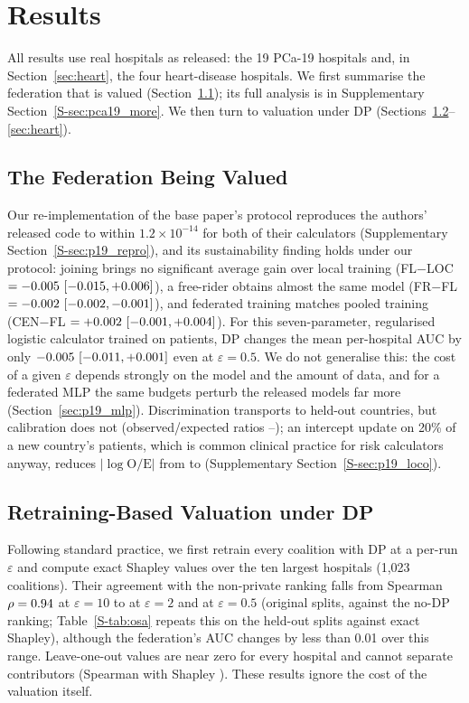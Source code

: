\section{Results}
\label{sec:results}
All results use real hospitals as released: the 19 PCa-19 hospitals and, in Section~\ref{sec:heart}, the four heart-disease hospitals. We first summarise the federation that is valued (Section~\ref{sec:federation}); its full analysis is in Supplementary Section~\ref{S-sec:pca19_more}. We then turn to valuation under DP (Sections~\ref{sec:p19_retrain}--\ref{sec:heart}).

\subsection{The Federation Being Valued}
\label{sec:federation}
Our re-implementation of the base paper's protocol reproduces the authors' released code to within $1.2\times10^{-14}$ for both of their calculators (Supplementary Section~\ref{S-sec:p19_repro}), and its sustainability finding holds under our protocol: joining brings no significant average gain over local training (FL$-$LOC $=-0.005\ [-0.015, +0.006]$), a free-rider obtains almost the same model (FR$-$FL $=-0.002\ [-0.002, -0.001]$), and federated training matches pooled training (CEN$-$FL $=+0.002\ [-0.001, +0.004]$). For this seven-parameter, regularised logistic calculator trained on \pNineN{} patients, DP changes the mean per-hospital AUC by only $-0.005\ [-0.011, +0.001]$ even at $\varepsilon=0.5$. We do not generalise this: the cost of a given $\varepsilon$ depends strongly on the model and the amount of data, and for a federated MLP the same budgets perturb the released models far more (Section~\ref{sec:p19_mlp}). Discrimination transports to held-out countries, but calibration does not (observed/expected ratios \pOeMin--\pOeMax); an intercept update on 20\% of a new country's patients, which is common clinical practice for risk calculators anyway, reduces $|\log\mathrm{O/E}|$ from \pRecalOeRaw{} to \pRecalOeInt{} (Supplementary Section~\ref{S-sec:p19_loco}).

\subsection{Retraining-Based Valuation under DP}
\label{sec:p19_retrain}
Following standard practice, we first retrain every coalition with DP at a per-run $\varepsilon$ and compute exact Shapley values over the ten largest hospitals (1{,}023 coalitions). Their agreement with the non-private ranking falls from Spearman $\rho=0.94$ at $\varepsilon=10$ to \pShRhoTwo{} at $\varepsilon=2$ and \pShRhoHalf{} at $\varepsilon=0.5$ (original splits, against the no-DP ranking; Table~\ref{S-tab:osa} repeats this on the held-out splits against exact Shapley), although the federation's AUC changes by less than 0.01 over this range. Leave-one-out values are near zero for every hospital and cannot separate contributors (Spearman with Shapley \pShLooRho). These results ignore the cost of the valuation itself.

